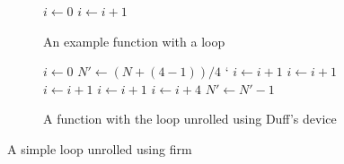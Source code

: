 \begin{figure}[h]
    \begin{subfigure}[b]{0.5\textwidth}
        \centering
        \begin{algorithmic}
                \State $i \gets 0$
                    \State {}
                    \State $i \gets i + 1$
                \EndWhile
            \EndFunction
        \end{algorithmic}
        \caption{An example function with a loop}
    \end{subfigure}
    \begin{subfigure}[b]{0.5\textwidth}
        \centering
        \begin{algorithmic}
                \State $i \gets 0$
                \State $N' \gets (N + (4 - 1)) / 4$
`               
                        \State {}
                        \State $i \gets i + 1$ 
                    \EndCase
                        \State {}
                        \State $i \gets i + 1$ 
                    \EndCase
                        \State {}
                        \State $i \gets i + 1$ 
                    \EndCase
                        \State {}
                        \State $i \gets i + 1$
                    \EndCase
                \EndSwitch
                    \State {}
                    \State {}
                    \State {}
                    \State {}
                    \State $i \gets i + 4$
                    \State $N' \gets N' - 1$
                \EndWhile
            \EndFunction
        \end{algorithmic}
        \caption{A function with the loop unrolled using Duff's device}
    \end{subfigure}
    \caption{A simple loop unrolled using firm}
    \label{fig:basics:duff}
\end{figure}